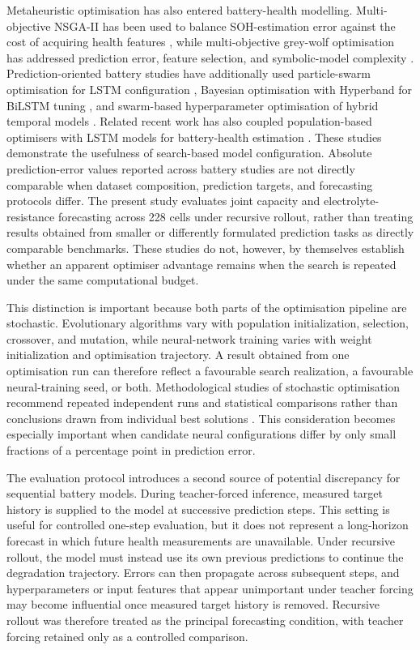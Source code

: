 \documentclass[a4paper,fleqn]{cas-sc}
\begin{document}
Metaheuristic optimisation has also entered battery-health modelling. Multi-objective NSGA-II has been used to balance SOH-estimation error against the cost of acquiring health features \cite{cai2020battery}, while multi-objective grey-wolf optimisation has addressed prediction error, feature selection, and symbolic-model complexity \cite{li2024mogwo}. Prediction-oriented battery studies have additionally used particle-swarm optimisation for LSTM configuration \cite{gong2022psolstm}, Bayesian optimisation with Hyperband for BiLSTM tuning \cite{yang2025bohb}, and swarm-based hyperparameter optimisation of hybrid temporal models \cite{quan2025qhdbo}. Related recent work has also coupled population-based optimisers with LSTM models for battery-health estimation \cite{peng2025igwolstm,li2026ssa}. These studies demonstrate the usefulness of search-based model configuration. Absolute prediction-error values reported across battery studies are not directly comparable when dataset composition, prediction targets, and forecasting protocols differ. The present study evaluates joint capacity and electrolyte-resistance forecasting across 228 cells under recursive rollout, rather than treating results obtained from smaller or differently formulated prediction tasks as directly comparable benchmarks. These studies do not, however, by themselves establish whether an apparent optimiser advantage remains when the search is repeated under the same computational budget.

This distinction is important because both parts of the optimisation pipeline are stochastic. Evolutionary algorithms vary with population initialization, selection, crossover, and mutation, while neural-network training varies with weight initialization and optimisation trajectory. A result obtained from one optimisation run can therefore reflect a favourable search realization, a favourable neural-training seed, or both. Methodological studies of stochastic optimisation recommend repeated independent runs and statistical comparisons rather than conclusions drawn from individual best solutions \cite{derrac2011nonparam,latorre2021guidelines}. This consideration becomes especially important when candidate neural configurations differ by only small fractions of a percentage point in prediction error.

The evaluation protocol introduces a second source of potential discrepancy for sequential battery models. During teacher-forced inference, measured target history is supplied to the model at successive prediction steps. This setting is useful for controlled one-step evaluation, but it does not represent a long-horizon forecast in which future health measurements are unavailable. Under recursive rollout, the model must instead use its own previous predictions to continue the degradation trajectory. Errors can then propagate across subsequent steps, and hyperparameters or input features that appear unimportant under teacher forcing may become influential once measured target history is removed. Recursive rollout was therefore treated as the principal forecasting condition, with teacher forcing retained only as a controlled comparison.
\end{document}
